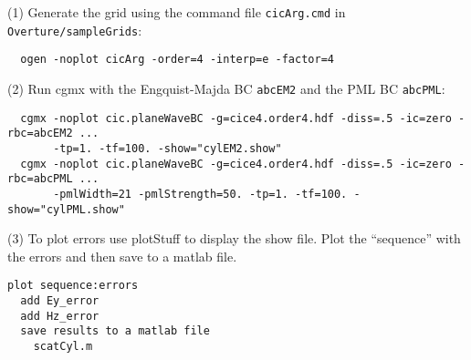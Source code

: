 \documentclass{article}
\begin{document}
\noindent (1) Generate the grid using the command file {\tt cicArg.cmd} in {\tt Overture/sampleGrids}:
\begin{verbatim}
  ogen -noplot cicArg -order=4 -interp=e -factor=4
\end{verbatim}

\noindent (2) Run cgmx with the Engquist-Majda BC {\tt abcEM2} and the PML BC {\tt abcPML}: 
\begin{verbatim}
  cgmx -noplot cic.planeWaveBC -g=cice4.order4.hdf -diss=.5 -ic=zero -rbc=abcEM2 ...
       -tp=1. -tf=100. -show="cylEM2.show"
  cgmx -noplot cic.planeWaveBC -g=cice4.order4.hdf -diss=.5 -ic=zero -rbc=abcPML ...
       -pmlWidth=21 -pmlStrength=50. -tp=1. -tf=100. -show="cylPML.show"
\end{verbatim}

\noindent (3) To plot errors use plotStuff to display the show file. Plot the ``sequence'' with the errors
and then save to a matlab file. 
\begin{verbatim}
plot sequence:errors
  add Ey_error
  add Hz_error
  save results to a matlab file
    scatCyl.m 
\end{verbatim}
\end{document}
